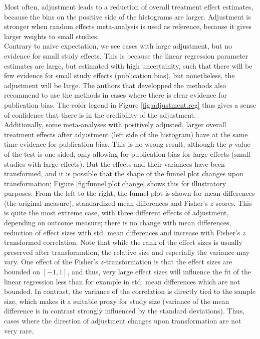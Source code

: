 \documentclass[11pt,a4paper,twoside]{book}\usepackage[]{graphicx}\usepackage[]{color}
\begin{document}
Most often, adjustment leads to a reduction of overall treatment effect estimates, because the bins on the positive side of the histograms are larger. Adjustment is stronger when random effects meta-analysis is used as reference, because it gives larger weights to small studies.\\
Contrary to naive expectation, we see cases with large adjustment, but no evidence for small study effects. This is because the linear regression parameter estimates are large, but estimated with high uncertainity, such that there will be few evidence for small study effects (publication bias), but nonetheless, the adjustment will be large. The authors that developped the methods also recommend to use the methods in cases where there is clear evidence for publication bias. The color legend in Figure \ref{fig:adjustment.reg} thus gives a sense of confidence that there is in the credibility of the adjustment. \\
Additionally, some meta-analyses with positively adjusted, larger overall treatment effects after adjustment (left side of the histogram) have at the same time evidence for publication bias. This is no wrong result, although the $p$-value of the test is one-sided, \ie only allowing for publication bias for large effects (small studies with large effects). But the effects and their variances have been transformed, and it is possible that the shape of the funnel plot changes upon transformation; Figure \ref{fig:funnel.plot.change} shows this for illustratory purposes. From the left to the right, the funnel plot is shown for mean differences (the original measure), standardized mean differences and Fisher's $z$ scores. This is quite the most extreme case, with three different effects of adjustment, depending on outcome measure; there is no change with mean differences, reduction of effect sizes with std. mean differences and increase with Fisher's $z$ transformed correlation. Note that while the rank of the effect sizes is usually preserved after transformation, the relative size and especially the variance may vary. One effect of the Fisher's $z$-transformation is that the effect sizes are bounded on $[-1,1]$, and thus, very large effect sizes will influence the fit of the linear regression less than for example in std. mean differences which are not bounded. In contrast, the variance of the correlation is directly tied to the sample size, which makes it a suitable proxy for study size (variance of the mean difference is in contrast strongly influenced by the standard deviations). Thus, cases where the direction of adjustment changes upon transformation are not very rare.
\end{document}
